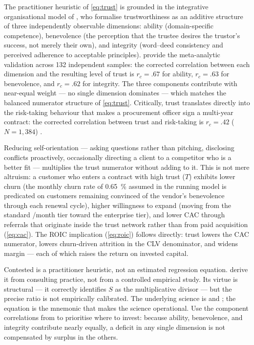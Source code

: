 The practitioner heuristic of \cref{eq:trust} is grounded in the integrative organisational
model of \textcite{mayer1995model}, who formalise trustworthiness as an additive structure
of three independently observable dimensions: ability (domain-specific competence),
benevolence (the perception that the trustee desires the trustor's success, not merely their
own), and integrity (word--deed consistency and perceived adherence to acceptable principles).
\textcite{colquitt2007meta} provide the meta-analytic validation across 132 independent
samples: the corrected correlation between each dimension and the resulting level of trust
is \(r_c = .67\) for ability, \(r_c = .63\) for benevolence, and \(r_c = .62\) for
integrity.
The three components contribute with near-equal weight --- no single dimension dominates ---
which matches the balanced numerator structure of \cref{eq:trust}. Critically, trust
translates directly into the risk-taking behaviour that makes a procurement officer sign a
multi-year contract: the corrected correlation between trust and risk-taking is
\(r_c = .42\) (\(N = 1{,}384\)) \parencite{colquitt2007meta}.

Reducing self-orientation --- asking questions rather than pitching, disclosing conflicts
proactively, occasionally directing a client to a competitor who is a better fit ---
multiplies the trust numerator without adding to it. This is not mere altruism: a customer
who enters a contract with high trust (\(T\)) exhibits lower churn (the monthly churn rate
of \qty{0.65}{\percent} assumed in the running model is predicated on customers remaining
convinced of the vendor's benevolence through each renewal cycle), higher willingness to
expand (moving from the standard /month tier toward the enterprise tier), and
lower CAC through referrals that originate inside the trust network rather than from paid
acquisition (\cref{eq:cac}). The ROIC implication (\cref{eq:roic}) follows directly: trust
lowers the CAC numerator, lowers churn-driven attrition in the CLV denominator, and widens
margin --- each of which raises the return on invested capital.

\begin{admonition}{Contested}
 is a practitioner heuristic, not an estimated regression equation.
\textcite{maister2000trusted} derive it from consulting practice, not from a controlled
empirical study. Its virtue is structural --- it correctly identifies \(S\) as the
multiplicative divisor --- but the precise ratio is not empirically calibrated. The
underlying science is \textcite{mayer1995model} and \textcite{colquitt2007meta}; the
equation is the mnemonic that makes the science operational. Use the component correlations
from \textcite{colquitt2007meta} to prioritise where to invest: because ability, benevolence,
and integrity contribute nearly equally, a deficit in any single dimension is not
compensated by surplus in the others.
\end{admonition}

